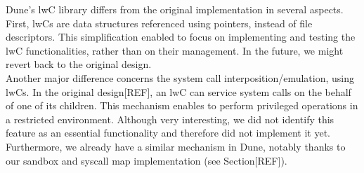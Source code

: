 Dune's lwC library differs from the original implementation in several aspects.
First, lwCs are data structures referenced using pointers, instead of file descriptors.
This simplification enabled to focus on implementing and testing the lwC functionalities, rather than on their management.
In the future, we might revert back to the original design.\\
Another major difference concerns the system call interposition/emulation, using lwCs.
In the original design[REF], an lwC can service system calls on the behalf of one of its children.
This mechanism enables to perform privileged operations in a restricted environment.
Although very interesting, we did not identify this feature as an essential functionality and therefore did not implement it yet.
Furthermore, we already have a similar mechanism in Dune, notably thanks to our sandbox and syscall map implementation (see Section[REF]).





